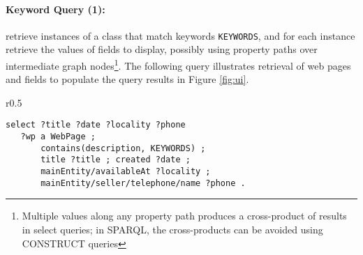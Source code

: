 \paragraph{Keyword Query (1):} retrieve instances of a class that match keywords \verb|KEYWORDS|, and for each instance retrieve the values of fields to display, possibly using property paths over intermediate graph nodes\footnote{Multiple values along any property path produces a cross-product of results in select queries; in SPARQL, the cross-products can be avoided using  CONSTRUCT queries}.
The following query illustrates retrieval of web pages and fields to populate the query results in Figure \ref{fig:ui}.
%
\begin{wrapfigure}{r}{0.5\textwidth}
{\footnotesize
\begin{verbatim}
select ?title ?date ?locality ?phone
   ?wp a WebPage ; 
       contains(description, KEYWORDS) ;   
       title ?title ; created ?date ;
       mainEntity/availableAt ?locality ;
       mainEntity/seller/telephone/name ?phone .
\end{verbatim}}
\end{wrapfigure}
